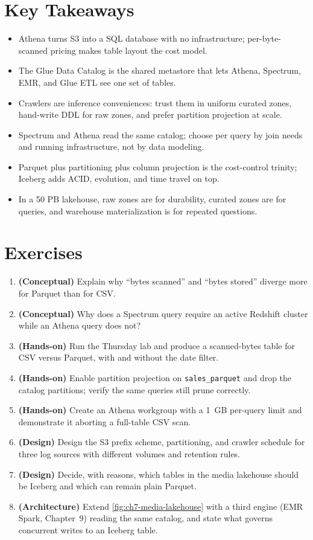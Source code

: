\section*{Key Takeaways}
\begin{itemize}
    \item Athena turns S3 into a SQL database with no infrastructure; per-byte-scanned pricing makes table layout the cost model.
    \item The Glue Data Catalog is the shared metastore that lets Athena, Spectrum, EMR, and Glue ETL see one set of tables.
    \item Crawlers are inference conveniences: trust them in uniform curated zones, hand-write DDL for raw zones, and prefer partition projection at scale.
    \item Spectrum and Athena read the same catalog; choose per query by join needs and running infrastructure, not by data modeling.
    \item Parquet plus partitioning plus column projection is the cost-control trinity; Iceberg adds ACID, evolution, and time travel on top.
    \item In a 50 PB lakehouse, raw zones are for durability, curated zones are for queries, and warehouse materialization is for repeated questions.
\end{itemize}

\section{Exercises}
\begin{enumerate}
    \item \textbf{(Conceptual)} Explain why ``bytes scanned'' and ``bytes stored'' diverge more for Parquet than for CSV.
    \item \textbf{(Conceptual)} Why does a Spectrum query require an active Redshift cluster while an Athena query does not?
    \item \textbf{(Hands-on)} Run the Thursday lab and produce a scanned-bytes table for CSV versus Parquet, with and without the date filter.
    \item \textbf{(Hands-on)} Enable partition projection on \texttt{sales\_parquet} and drop the catalog partitions; verify the same queries still prune correctly.
    \item \textbf{(Hands-on)} Create an Athena workgroup with a 1~GB per-query limit and demonstrate it aborting a full-table CSV scan.
    \item \textbf{(Design)} Design the S3 prefix scheme, partitioning, and crawler schedule for three log sources with different volumes and retention rules.
    \item \textbf{(Design)} Decide, with reasons, which tables in the media lakehouse should be Iceberg and which can remain plain Parquet.
    \item \textbf{(Architecture)} Extend \cref{fig:ch7-media-lakehouse} with a third engine (EMR Spark, Chapter~9) reading the same catalog, and state what governs concurrent writes to an Iceberg table.
\end{enumerate}

